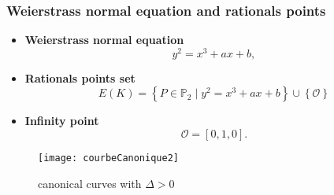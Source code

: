 \begin{frame}[t]
    \frametitle{Weierstrass normal equation and rationals points}
    \begin{minipage}[t]{0.48\linewidth}
        
        \begin{itemize}
        \item \textbf{Weierstrass normal equation}
       \[
       y^2=x^3+ax+b
       ,\] 
       \item \textbf{Rationals points set}
       \[
    E(K) = \left\{ P \in \mathbb{P}_{2} \mid y^2 = x^3 + ax + b \right\} \cup \left\{
       \mathcal{O} \right\}  
       \] 
       \item \textbf{Infinity point}
       \[
       \mathcal{O} = [0,1,0]
       .\] 
        \end{itemize}

    \end{minipage}%
    \hfill%
    \begin{minipage}[t]{0.48\linewidth}
       \begin{figure}[h]
           \centering
           \texttt{[image: courbeCanonique2]}
           \caption{canonical curves with $\Delta > 0$}
           \label{fig:courbeCanonique2}
       \end{figure} 
    \end{minipage}
\end{frame}
